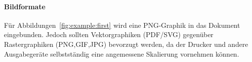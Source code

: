 \paragraph{Bildformate}

Für Abbildungen~\ref{fig:example:first} wird eine PNG-Graphik
in das Dokument eingebunden.
Jedoch sollten Vektorgraphiken (PDF/SVG) gegenüber Rastergraphiken (PNG,GIF,JPG)
bevorzugt werden, da der Drucker und andere Ausgabegeräte selbstständig eine
angemessene Skalierung vornehmen können.




